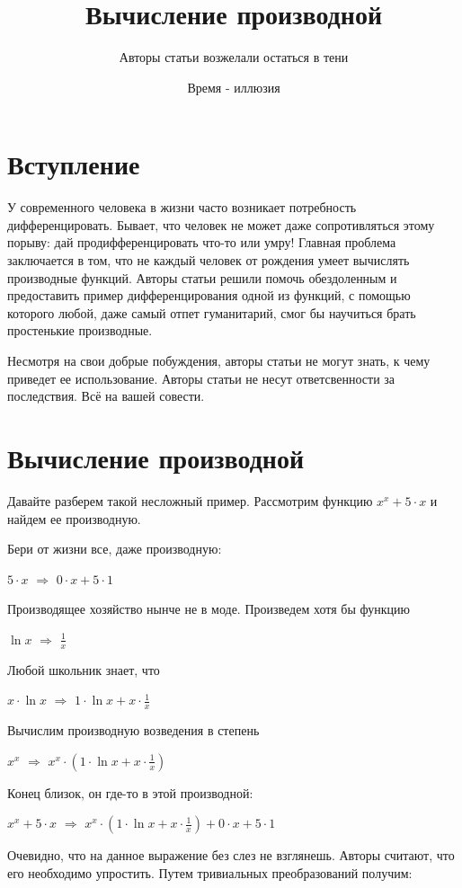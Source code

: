 \documentclass{article}
\title{Вычисление производной}
\author{Авторы статьи возжелали остаться в тени}
\date{Время - иллюзия}
\begin{document}
\maketitle

\section{Вступление}

У современного человека в жизни часто возникает потребность дифференцировать. Бывает, что человек не может даже сопротивляться этому порыву: дай продифференцировать что-то или умру! Главная проблема заключается в том, что не каждый человек от рождения умеет вычислять производные функций. Авторы статьи решили помочь обездоленным и предоставить пример дифференцирования одной из функций, с помощью которого любой, даже самый отпет гуманитарий, смог бы научиться брать простенькие производные.

Несмотря на свои добрые побуждения, авторы статьи не могут знать, к чему приведет ее использование. Авторы статьи не несут ответсвенности за последствия. Всё на вашей совести.

\section{Вычисление производной}


Давайте разберем такой несложный пример. Рассмотрим функцию $x ^ {x} + 5 \cdot x$ и найдем ее производную.

Бери от жизни все, даже производную:

$5 \cdot x$ $\Rightarrow$ $0 \cdot x + 5 \cdot 1$

Производящее хозяйство нынче не в моде. Произведем хотя бы функцию

$ \ln x$ $\Rightarrow$ $\frac{1}{x}$

Любой школьник знает, что

$x \cdot  \ln x$ $\Rightarrow$ $1 \cdot  \ln x + x \cdot \frac{1}{x}$

Вычислим производную возведения в степень

$x ^ {x}$ $\Rightarrow$ $x ^ {x} \cdot (1 \cdot  \ln x + x \cdot \frac{1}{x})$

Конец близок, он где-то в этой производной:

$x ^ {x} + 5 \cdot x$ $\Rightarrow$ $x ^ {x} \cdot (1 \cdot  \ln x + x \cdot \frac{1}{x}) + 0 \cdot x + 5 \cdot 1$

Очевидно, что на данное выражение без слез не взглянешь. Авторы считают, что его необходимо упростить. Путем тривиальных преобразований получим:
\end{document}
